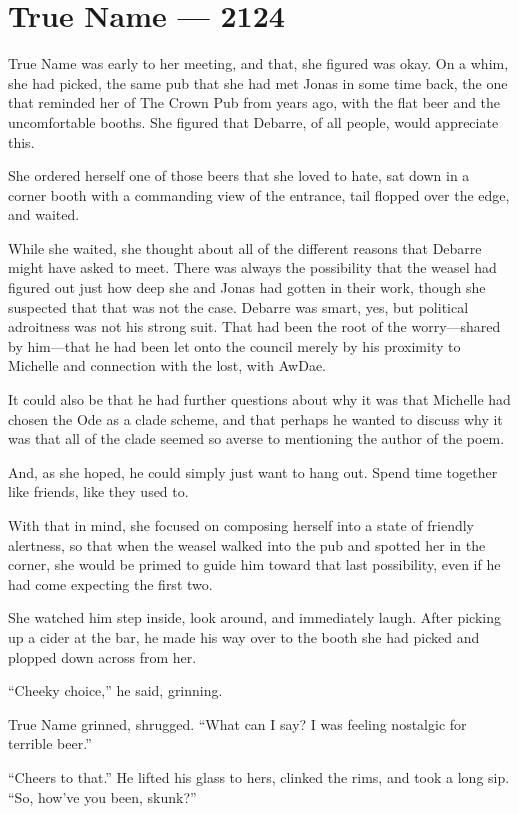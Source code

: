 \hypertarget{true-name-2124}{%
\chapter{True Name — 2124}\label{true-name-2124}}

True Name was early to her meeting, and that, she figured was okay. On a whim, she had picked, the same pub that she had met Jonas in some time back, the one that reminded her of The Crown Pub from years ago, with the flat beer and the uncomfortable booths. She figured that Debarre, of all people, would appreciate this.

She ordered herself one of those beers that she loved to hate, sat down in a corner booth with a commanding view of the entrance, tail flopped over the edge, and waited.

While she waited, she thought about all of the different reasons that Debarre might have asked to meet. There was always the possibility that the weasel had figured out just how deep she and Jonas had gotten in their work, though she suspected that that was not the case. Debarre was smart, yes, but political adroitness was not his strong suit. That had been the root of the worry---shared by him---that he had been let onto the council merely by his proximity to Michelle and connection with the lost, with AwDae.

It could also be that he had further questions about why it was that Michelle had chosen the Ode as a clade scheme, and that perhaps he wanted to discuss why it was that all of the clade seemed so averse to mentioning the author of the poem.

And, as she hoped, he could simply just want to hang out. Spend time together like friends, like they used to.

With that in mind, she focused on composing herself into a state of friendly alertness, so that when the weasel walked into the pub and spotted her in the corner, she would be primed to guide him toward that last possibility, even if he had come expecting the first two.

She watched him step inside, look around, and immediately laugh. After picking up a cider at the bar, he made his way over to the booth she had picked and plopped down across from her.

``Cheeky choice,'' he said, grinning.

True Name grinned, shrugged. ``What can I say? I was feeling nostalgic for terrible beer.''

``Cheers to that.'' He lifted his glass to hers, clinked the rims, and took a long sip. ``So, how've you been, skunk?''

